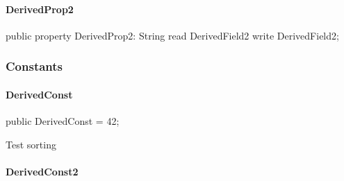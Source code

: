 \documentclass{report}
\begin{document}
\paragraph*{DerivedProp2}\hspace*{\fill}

\begin{list}{}{
\setlength{\itemindent}{0cm}
\setlength{\listparindent}{0cm}
\setlength{\leftmargin}{\evensidemargin}
\addtolength{\leftmargin}{\tmplength}
\settowidth{\labelsep}{X}
\addtolength{\leftmargin}{\labelsep}
\setlength{\labelwidth}{\tmplength}
}
\begin{flushleft}
\item[\textbf{Declaration}\hfill]
\begin{ttfamily}
public property DerivedProp2: String read DerivedField2 write DerivedField2;\end{ttfamily}


\end{flushleft}
\end{list}
\subsubsection*{\large{\textbf{Constants}}\normalsize\hspace{1ex}\hfill}
\paragraph*{DerivedConst}\hspace*{\fill}

\begin{list}{}{
\setlength{\itemindent}{0cm}
\setlength{\listparindent}{0cm}
\setlength{\leftmargin}{\evensidemargin}
\addtolength{\leftmargin}{\tmplength}
\settowidth{\labelsep}{X}
\addtolength{\leftmargin}{\labelsep}
\setlength{\labelwidth}{\tmplength}
}
\begin{flushleft}
\item[\textbf{Declaration}\hfill]
\begin{ttfamily}
public DerivedConst = 42;\end{ttfamily}


\end{flushleft}
\par
\item[\textbf{Description}]
Test sorting

\end{list}
\paragraph*{DerivedConst2}\hspace*{\fill}
\end{document}
